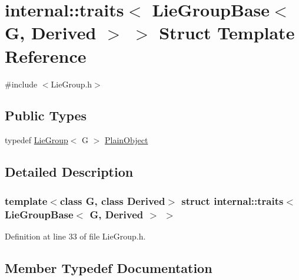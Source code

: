 \hypertarget{structinternal_1_1traits_3_01_lie_group_base_3_01_g_00_01_derived_01_4_01_4}{}\section{internal\+:\+:traits$<$ Lie\+Group\+Base$<$ G, Derived $>$ $>$ Struct Template Reference}
\label{structinternal_1_1traits_3_01_lie_group_base_3_01_g_00_01_derived_01_4_01_4}


{\ttfamily \#include $<$Lie\+Group.\+h$>$}

\subsection*{Public Types}
\begin{DoxyCompactItemize}
\item 
typedef \hyperlink{class_lie_group}{Lie\+Group}$<$ G $>$ \hyperlink{structinternal_1_1traits_3_01_lie_group_base_3_01_g_00_01_derived_01_4_01_4_ab084d160b54f79b7e1b9a594abd31e5f}{Plain\+Object}
\end{DoxyCompactItemize}


\subsection{Detailed Description}
\subsubsection*{template$<$class G, class Derived$>$\newline
struct internal\+::traits$<$ Lie\+Group\+Base$<$ G, Derived $>$ $>$}



Definition at line 33 of file Lie\+Group.\+h.



\subsection{Member Typedef Documentation}
\hypertarget{structinternal_1_1traits_3_01_lie_group_base_3_01_g_00_01_derived_01_4_01_4_ab084d160b54f79b7e1b9a594abd31e5f}{}\label{structinternal_1_1traits_3_01_lie_group_base_3_01_g_00_01_derived_01_4_01_4_ab084d160b54f79b7e1b9a594abd31e5f} 
